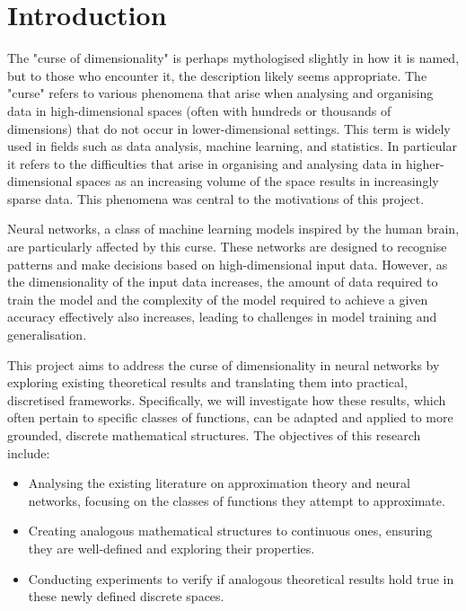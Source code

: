 \documentclass[11pt,a4paper]{article}
\begin{document}

\pagebreak

\section{Introduction}


The "curse of dimensionality" is perhaps mythologised slightly in how it is named, but to those who encounter it, the description likely seems appropriate. The "curse" refers to various phenomena that arise when analysing and organising data in high-dimensional spaces (often with hundreds or thousands of dimensions) that do not occur in lower-dimensional settings. This term is widely used in fields such as data analysis, machine learning, and statistics. In particular it refers to the difficulties that arise in organising and analysing data in higher-dimensional spaces as an increasing volume of the space results in increasingly sparse data. \cite{enwiki:1223692835} This phenomena was central to the motivations of this project.

Neural networks, a class of machine learning models inspired by the human brain, are particularly affected by this curse. These networks are designed to recognise patterns and make decisions based on high-dimensional input data. However, as the dimensionality of the input data increases, the amount of data required to train the model and the complexity of the model required to achieve a given accuracy effectively also increases, leading to challenges in model training and generalisation.

This project aims to address the curse of dimensionality in neural networks by exploring existing theoretical results and translating them into practical, discretised frameworks. Specifically, we will investigate how these results, which often pertain to specific classes of functions, can be adapted and applied to more grounded, discrete mathematical structures. The objectives of this research include:

\begin{itemize}
    \item Analysing the existing literature on approximation theory and neural networks, focusing on the classes of functions they attempt to approximate.
    \item Creating analogous mathematical structures to continuous ones, ensuring they are well-defined and exploring their properties.
    \item Conducting experiments to verify if analogous theoretical results hold true in these newly defined discrete spaces.
\end{itemize}
\end{document}
